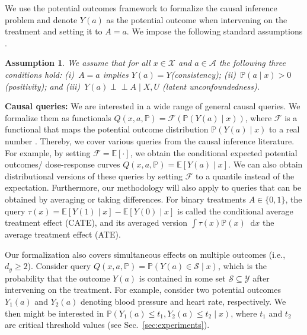 \documentclass{article} %
\newcommand{\indep}{\perp \!\!\! \perp}
\newcommand*\diff{\mathop{}\!\mathrm{d}}
\theoremstyle{definition}
\newtheorem{assumption}{Assumption}
\theoremstyle{plain}
\begin{document}
We use the potential outcomes framework to formalize the causal inference problem \citep{Rubin.1974} and denote $Y(a)$ as the potential outcome when intervening on the treatment and setting it to $A = a$. We impose the following standard assumptions \citep{Dorn.2022}.
\begin{assumption}\label{ass:causal}
\emph{We assume that for all $x \in \mathcal{X}$ and $a \in \mathcal{A}$ the following three conditions hold: (i)~$A=a$ implies $Y(a) = Y$(consistency); (ii)~$\mathbb{P}(a \mid x) > 0$ (positivity); and (iii)~$Y(a) \indep A \mid X, U$ (latent unconfoundedness).}
\end{assumption}

\textbf{Causal queries:} We are interested in a wide range of general causal queries. We formalize them as functionals $Q(x, a, \mathbb{P}) = \mathcal{F}(\mathbb{P}(Y(a) \mid x))$, where $\mathcal{F}$ is a functional that maps the potential outcome distribution $\mathbb{P}(Y(a) \mid x)$ to a real number \citep{Frauen.2023c}. Thereby, we cover various queries from the causal inference literature. For example, by setting $\mathcal{F} = \mathbb{E}[\cdot]$, we obtain the conditional expected potential outcomes/ dose-response curves $Q(x, a, \mathbb{P}) = \mathbb{E}[Y(a) \mid x]$. We can also obtain distributional versions of these queries by setting $\mathcal{F}$ to a quantile instead of the expectation. Furthermore, our methodology will also apply to queries that can be obtained by averaging or taking differences. For binary treatments $A \in \{0,1\}$, the query $\tau(x) = \mathbb{E}[Y(1) \mid x] - \mathbb{E}[Y(0) \mid x]$ is called the conditional average treatment effect (CATE), and its averaged version $\int \tau(x) \mathbb{P}(x) \diff x$ the average treatment effect (ATE).

Our formalization also covers simultaneous effects on multiple outcomes (i.e., $d_y \geq 2$). Consider query $Q(x, a, \mathbb{P}) = \mathbb{P}(Y(a) \in \mathcal{S} \mid x)$, which is the probability that the outcome $Y(a)$ is contained in some set $\mathcal{S} \subseteq \mathcal{Y}$ after intervening on the treatment. For example, consider two potential outcomes $Y_1(a)$ and $Y_2(a)$ denoting blood pressure and heart rate, respectively. We then might be interested in $\mathbb{P}(Y_1(a) \leq t_1, Y_2(a) \leq t_2 \mid x)$, where $t_1$ and $t_2$ are critical threshold values (see Sec.~\ref{sec:experiments}).

\end{document}
